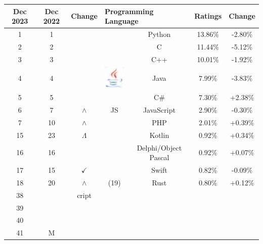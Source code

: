 \begin{center}
\begin{tabular}{|c|c|c|c|c|c|c|}
\hline
Dec 2023 & Dec 2022 & Change & \multicolumn{2}{|l|}{Programming Language} & Ratings & Change \\
\hline
1 & 1 &  &  & Python & 13.86\% & -2.80\% \\
\hline
2 & 2 &  &  & C & 11.44\% & -5.12\% \\
\hline
3 & 3 &  &  & C++ & 10.01\% & -1.92\% \\
\hline
4 & 4 &  & \includegraphics[width=\linewidth]{images/2025_01_02_68113d8fd21152cab1dbg-37}
 & Java & 7.99\% & -3.83\% \\
\hline
5 & 5 &  &  & C\# & 7.30\% & +2.38\% \\
\hline
6 & 7 & $\wedge$ & JS & JavaScript & 2.90\% & -0.30\% \\
\hline
7 & 10 & $\wedge$ &  & PHP & 2.01\% & +0.39\% \\
\hline
15 & 23 & $\Lambda$ &  & Kotlin & 0.92\% & +0.34\% \\
\hline
16 & 16 &  &  & Delphi/Object Pascal & 0.92\% & +0.07\% \\
\hline
17 & 15 & $\checkmark$ &  & Swift & 0.82\% & -0.09\% \\
\hline
18 & 20 & $\wedge$ & (19) & Rust & 0.80\% & +0.12\% \\
\hline
38 &  & cript &  &  &  &  \\
\hline
39 &  &  &  &  &  &  \\
\hline
40 &  &  &  &  &  &  \\
\hline
41 & M &  &  &  &  &  \\
\hline
\end{tabular}
\end{center}

